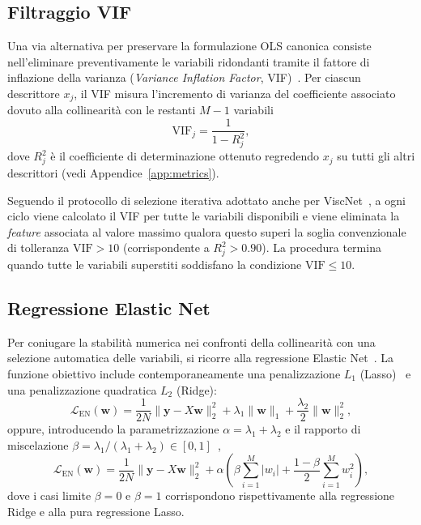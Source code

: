 \documentclass[../main.tex]{subfiles}
\begin{document}
	\subsection{Filtraggio VIF}
	\label{sec:vif_intro}
	
	Una via alternativa per preservare la formulazione OLS canonica consiste nell'eliminare preventivamente le variabili ridondanti tramite il fattore di inflazione della varianza (\textit{Variance Inflation Factor}, VIF)~\cite{marquardtGeneralizedInversesRidge1970}. Per ciascun descrittore $x_j$, il VIF misura l'incremento di varianza del coefficiente associato dovuto alla collinearità con le restanti $M-1$ variabili
	\begin{equation}
		\text{VIF}_j = \frac{1}{1 - R_j^2} ,
	\end{equation}
	dove $R_j^2$ è il coefficiente di determinazione ottenuto regredendo $x_j$ su tutti gli altri descrittori (vedi Appendice~\ref{app:metrics}).
	
	Seguendo il protocollo di selezione iterativa adottato anche per ViscNet~\cite{cassarViscNetNeuralNetwork2021}, a ogni ciclo viene calcolato il VIF per tutte le variabili disponibili e viene eliminata la \textit{feature} associata al valore massimo qualora questo superi la soglia convenzionale di tolleranza $\text{VIF} > 10$ (corrispondente a $R_j^2 > 0.90$). La procedura termina quando tutte le variabili superstiti soddisfano la condizione $\text{VIF} \le 10$.
	
	\subsection{Regressione Elastic Net}
	\label{sec:elastic_net_intro}
	
	Per coniugare la stabilità numerica nei confronti della collinearità con una selezione automatica delle variabili, si ricorre alla regressione Elastic Net~\cite{sharmaInterpretabilityLinearRegression2026}. La funzione obiettivo include contemporaneamente una penalizzazione $L_1$ (Lasso)~\cite{hastieElementsStatisticalLearning2009} e una penalizzazione quadratica $L_2$ (Ridge):
	\begin{equation}
		\mathcal{L}_{\text{EN}}(\mathbf{w}) = \frac{1}{2N} \|\mathbf{y} - X \mathbf{w}\|_2^2 + \lambda_1 \|\mathbf{w}\|_1 + \frac{\lambda_2}{2} \|\mathbf{w}\|_2^2,
	\end{equation}
	oppure, introducendo la parametrizzazione $\alpha = \lambda_1 + \lambda_2$ e il rapporto di miscelazione $\beta = \lambda_1 / (\lambda_1 + \lambda_2) \in [0, 1]$~\cite{sharmaInterpretabilityLinearRegression2026},
	\begin{equation}
		\mathcal{L}_{\text{EN}}(\mathbf{w}) = \frac{1}{2N} \|\mathbf{y} - X \mathbf{w}\|_2^2 + \alpha \left( \beta \sum_{i=1}^M |w_i| + \frac{1-\beta}{2} \sum_{i=1}^M w_i^2 \right) ,
	\end{equation}
	dove i casi limite $\beta = 0$ e $\beta = 1$ corrispondono rispettivamente alla regressione Ridge e alla pura regressione Lasso.
	
\end{document}
